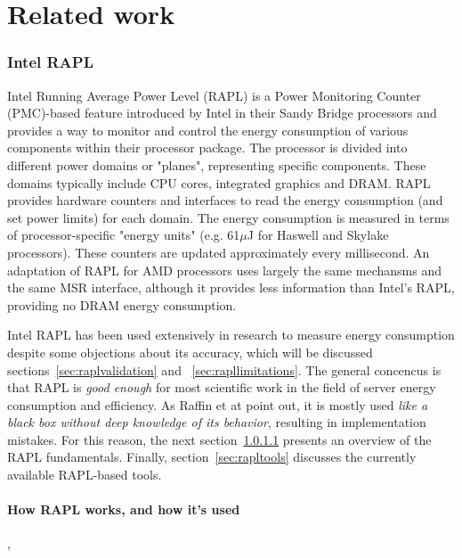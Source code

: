 \chapter{Related work} %
\label{Chapter2}

\subsection{Intel RAPL}

Intel Running Average Power Level (RAPL) is a Power Monitoring Counter (PMC)-based feature introduced by Intel in their Sandy Bridge processors and provides a way to monitor and control the energy consumption of various components within their processor package\parencite{projectexigence_rapl}. The processor is divided into different power domains or "planes", representing specific components. These domains typically include CPU cores, integrated graphics and DRAM. RAPL provides hardware counters  and interfaces to read the energy consumption (and set power limits) for each domain. The energy consumption is measured in terms of processor-specific "energy units" (e.g. 61$\mu$J for Haswell and Skylake processors). These counters are updated approximately every millisecond. An adaptation of RAPL for AMD processors uses largely the same mechansms and the same MSR interface\parencite{amd_energy}, although it provides less information than Intel's RAPL\parencite{schone2021energy}, providing no DRAM energy consumption.

Intel RAPL has been used extensively in research to measure energy consumption\parencite{kennes2023measuring} despite some objections about its accuracy, which will be discussed sections~\ref{sec:raplvalidation} and ~\ref{sec:rapllimitations}. The general concencus is that RAPL is \textit{good enough} for most scientific work in the field of server energy consumption and efficiency. As Raffin et at\parencite{raffin2024dissecting} point out, it is mostly used \textit{like a black box without deep knowledge of its behavior}, resulting in implementation mistakes. For this reason, the next section~\ref{sec:raplmethodology} presents an overview of the RAPL fundamentals. Finally, section~\ref{sec:rapltools} discusses the currently available RAPL-based tools.

\subsubsection{How RAPL works, and how it's used}
\label{sec:raplmethodology}
\parencite{schone2024energy}, \parencite{raffin2024dissecting}

